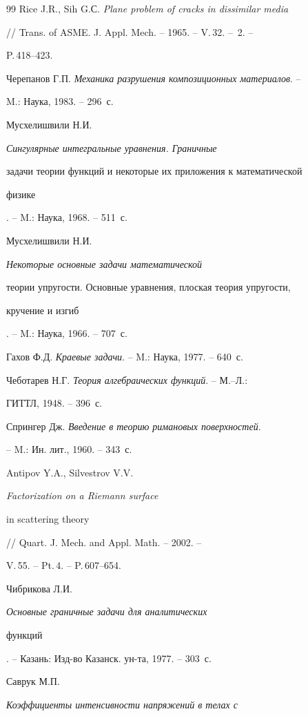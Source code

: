 \begin{thebibliography}{99}
Rice J.R., Sih G.С. {\em Plane problem of cracks in dissimilar media} 


// Trans. of ASME. J. Appl. Mech. -- 1965. -- V.\,32. -- \No\,2. -- 


P.\,418--423. 




Черепанов Г.П. {\em Механика разрушения композиционных материалов}. -- 


M.: Наука, 1983. -- 296~с. 




Мусхелишвили Н.И. {\em Сингулярные интегральные уравнения. Граничные 


задачи теории функций и некоторые их приложения к математической 


физике}. -- M.: Наука, 1968. -- 511~с. 




Мусхелишвили Н.И. {\em Некоторые основные задачи математической 


теории упругости. Основные уравнения, плоская теория упругости, 


кручение и изгиб}. -- M.: Наука, 1966. -- 707~с. 




Гахов Ф.Д. {\em Краевые задачи}. -- M.: Наука, 1977. -- 640~с. 




Чеботарев Н.Г. {\em Теория алгебраических функций}. -- М.--Л.: 


ГИТТЛ, 1948. -- 396~с. 




Спрингер Дж. {\em Введение в теорию римановых поверхностей}. 


-- M.: Ин. лит., 1960. -- 343~с. 




Antipov Y.A., Silvestrov V.V. {\em Factorization on a Riemann surface 


in scattering theory} // Quart. J. Mech. and Appl. Math. -- 2002. -- 


V.\,55. -- Pt.\,4. -- P.\,607--654. 




Чибрикова Л.И. {\em Основные граничные задачи для аналитических 


функций}. -- Казань: Изд-во Казанск. ун-та, 1977. -- 303~с. 




Саврук М.П. {\em Коэффициенты интенсивности напряжений в телах с 


}
\end{thebibliography}
